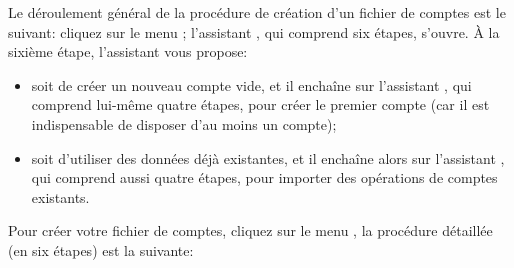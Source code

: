 Le déroulement général de la procédure de création d'un fichier de comptes est le suivant: cliquez sur le menu ; l'assistant , qui comprend six étapes, s'ouvre. À la sixième étape, l'assistant vous propose:

\begin{itemize}
	\item soit de créer un nouveau compte vide, et il enchaîne sur l'assistant , qui comprend lui-même quatre étapes, pour créer le premier compte (car il est indispensable de disposer d'au moins un compte);
	\item soit d'utiliser des données déjà existantes, et il enchaîne alors sur l'assistant , qui comprend aussi quatre étapes, pour importer des opérations de comptes existants.
\end{itemize}

Pour créer votre fichier de comptes, cliquez sur le menu , la procédure détaillée (en six étapes) est la suivante:

